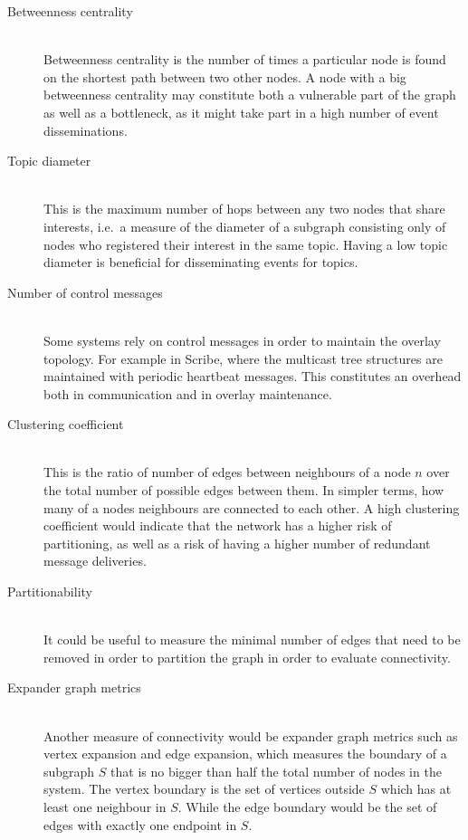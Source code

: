     \begin{description}

    \item[Betweenness centrality]\hfill\\
        Betweenness centrality is the number of times a particular node
        is found on the shortest path between two other nodes. A node
        with a big betweenness centrality may constitute both a
        vulnerable part of the graph as well as a bottleneck, as it
        might take part in a high number of event disseminations.

    \item[Topic diameter]\hfill\\
        This is the maximum number of hops between any two nodes that
        share interests, i.e.\ a measure of the diameter of a subgraph
        consisting only of nodes who registered their interest in the
        same topic. Having a low topic diameter is beneficial for
        disseminating events for topics.

    \item[Number of control messages]\hfill\\
        Some systems rely on
        control messages in order to maintain the overlay topology. For
        example in Scribe, where the multicast tree structures are
        maintained with periodic heartbeat messages. This constitutes an
        overhead both in communication and in overlay maintenance.

    \item[Clustering coefficient]\hfill\\
        This is the ratio of number of edges between neighbours of a node $n$ over
        the total number of possible edges between them. In simpler
        terms, how
        many of a nodes neighbours are connected to each other. A high
        clustering coefficient would indicate that the network has a
        higher risk of partitioning, as well as a risk of having a
        higher number of redundant message deliveries.

    \item[Partitionability]\hfill\\
        It could be useful to measure the minimal number of edges that
        need to be removed in order to partition the graph in order to
        evaluate connectivity.

    \item[Expander graph metrics]\hfill\\
        Another measure of connectivity would be expander graph metrics
        such as vertex expansion and edge expansion, which measures the
        boundary of a subgraph $S$ that is no bigger than half the total
        number of nodes in the system. The vertex boundary is the set of
        vertices outside $S$ which has at least one neighbour in $S$.
        While the edge boundary would be the set of edges with exactly
        one endpoint in $S$.

    \end{description}


